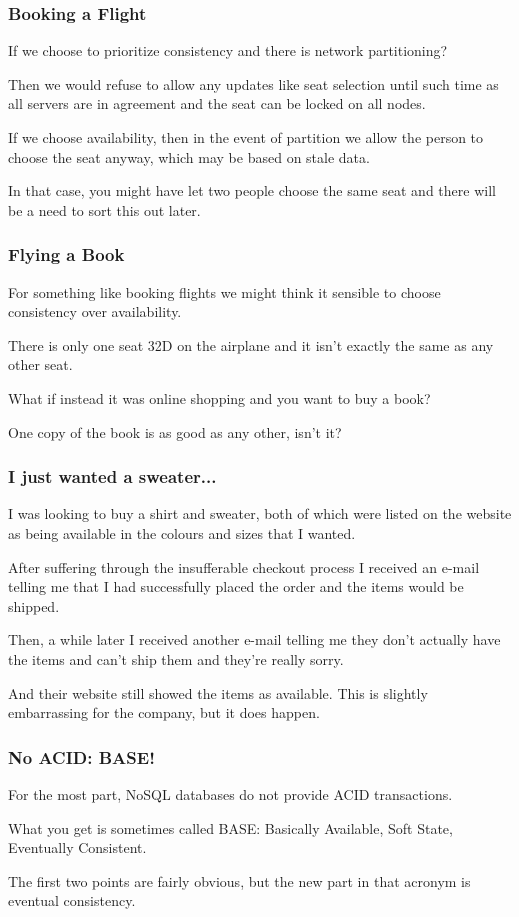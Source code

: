 \begin{frame}
\frametitle{Booking a Flight}

If we choose to prioritize consistency and there is network partitioning? 

Then we would refuse to allow any updates like seat selection until such time as all servers are in agreement and the seat can be locked on all nodes. 

If we choose availability, then in the event of partition we allow the person to choose the seat anyway, which may be based on stale data. 

In that case, you might have let two people choose the same seat and there will be a need to sort this out later. 

\end{frame}

\begin{frame}
\frametitle{Flying a Book}
For something like booking flights we might think it sensible to choose consistency over availability.

There is only one seat 32D on the airplane and it isn't exactly the same as any other seat. 

What if instead it was online shopping and you want to buy a book? 

One copy of the book is as good as any other, isn't it?

\end{frame}



\begin{frame}
\frametitle{I just wanted a sweater...}

I was looking to buy a shirt and sweater, both of which were listed on the website as being available in the colours and sizes that I wanted. 

After suffering through the insufferable checkout process I received an e-mail telling me that I had successfully placed the order and the items would be shipped. 

Then, a while later I received another e-mail telling me they don't actually have the items and can't ship them and they're really sorry. 

And their website still showed the items as available. This is slightly embarrassing for the company, but it does happen.

\end{frame}



\begin{frame}
\frametitle{No ACID: BASE!}

For the most part, NoSQL databases do not provide ACID transactions. 

What you get is sometimes called BASE: Basically Available, Soft State, Eventually Consistent. 

The first two points are fairly obvious, but the new part in that acronym is \alert{eventual consistency}.

\end{frame}




